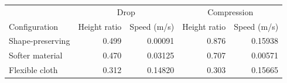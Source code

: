 \begin{tabular}{lrrrr}
\toprule
& \multicolumn{2}{c}{Drop} & \multicolumn{2}{c}{Compression} \\ Configuration & Height ratio & Speed (m/s) & Height ratio & Speed (m/s) \\
\midrule
Shape-preserving & 0.499 & 0.00091 & 0.876 & 0.15938 \\
Softer material & 0.470 & 0.03125 & 0.707 & 0.00571 \\
Flexible cloth & 0.312 & 0.14820 & 0.303 & 0.15665 \\
\bottomrule
\end{tabular}
